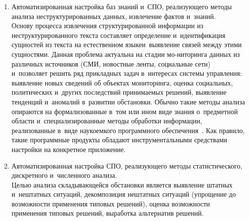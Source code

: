 \begin{multicols}{2}
\begin{enumerate}[1.]
\columnbreak
    
    \item Автоматизированная настройка баз знаний и~СПО, реа\-ли\-зу\-юще\-го 
методы анализа неструктурированных данных, извлечение фактов и~знаний.\\[-8pt]

    
    Основу процесса извлечения структурированной информации из 
неструктурированного текс\-та со\-став\-ля\-ет определение и~идентификация 
сущностей из текста на естественном языке\linebreak и~вы\-яв\-ле\-ние связей между этими 
сущностями. Данная проб\-ле\-ма актуальна на стадии мо-\linebreak ниторинга данных из 
различных источников (СМИ, 
новостные ленты, социальные сети)\linebreak  
и~позволяет решить ряд прикладных задач в~интересах сис\-те\-мы управ\-ле\-ния: 
выявление новых сведений об объектах мониторинга, оценка социальных, 
политических и~других последствий при\-ни\-ма\-емых решений, выявление 
тенденций и~аномалий в~развитии обстановки. Обычно такие методы 
анализа опираются на формализованные в~том или ином виде знания 
о~пред\-мет\-ной об\-ласти и~специализированные методы обработки 
информации, реализованные в~виде наукоемкого про\-грам\-мно\-го 
обеспечения~\cite{13-zac, 14-zac}. Как правило, такие про\-грам\-мные 
продукты обладают инструментальными средствами настройки на 
конкретное при\-ло\-жение.
{

}

\vspace*{6pt}
    
  
  \item Автоматизированная настройка СПО, реа\-ли\-зу\-юще\-го методы 
статистического, дискретного и~чис\-лен\-но\-го анализа.\\[-8pt]
    
    Целью анализа складывающейся обстановки является выявление 
штатных и~нештатных ситуаций, декомпозиция нештатных ситуаций 
(упрощение до воз\-мож\-ности применения типовых решений), оценка 
воз\-мож\-ности применения типовых решений, выработка альтернатив 
решений.
    

\end{enumerate}
\end{multicols}
